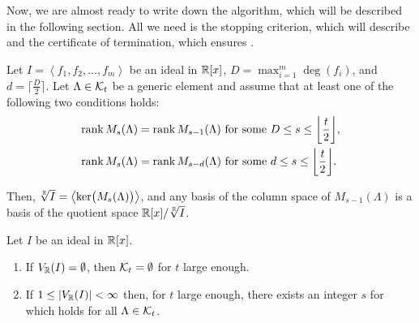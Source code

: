 Now, we are almost ready to write down the algorithm, which will be described in the following section.
All we need is the stopping criterion, which will describe  and the certificate of termination, which ensures .

\begin{theorem}
  Let $I = \left<f_1, f_2, \ldots, f_m\right>$ be an ideal in $\mathbb{R}[x]$, $D = \max_{i=1}^m\deg(f_i)$, and $d = \Big\lceil \frac{D}{2} \Big\rceil$.
  Let $\Lambda\in\mathcal{K}_t$ be a generic element and assume that at least one of the following two conditions holds:
  \begin{align}
    \rank\MLs &= \rank M_{s-1}(\Lambda) \text{ for some } D\leq s \leq \bigg\lfloor \frac{t}{2} \bigg\rfloor,\labeleq{POP:sol:stop1}\\
    \rank\MLs &= \rank M_{s-d}(\Lambda) \text{ for some } d\leq s \leq \bigg\lfloor \frac{t}{2} \bigg\rfloor.\labeleq{POP:sol:stop2}
  \end{align}
\end{theorem}
Then, $\sqrt[\mathbb{R}]{I}=\left<\operatorname{ker}\!\big(M_s(\Lambda)\big)\right>$, and any basis of the column space of $M_{s-1}(\Lambda)$ is a basis of the quotient space $\mathbb{R}[x]/\sqrt[\mathbb{R}]{I}$.

\begin{theorem}
  Let $I$ be an ideal in $\mathbb{R}[x]$.
  \begin{enumerate}
    \item If $V_{\mathbb{R}}(I)=\emptyset$, then $\mathcal{K}_t=\emptyset$ for $t$ large enough.
    \item If $1\leq|V_{\mathbb{R}}(I)|<\infty$ then, for $t$ large enough, there exists an integer $s$ for which  holds for all $\Lambda\in\mathcal{K}_t$.
  \end{enumerate}
\end{theorem}
